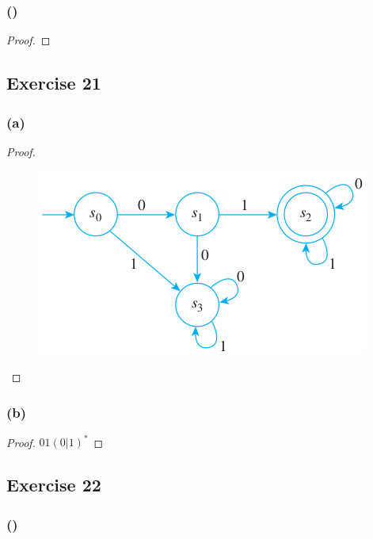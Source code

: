 \documentclass[14pt]{extarticle}
\begin{document}
\subsubsection{()}

\begin{proof}

\end{proof}

\subsection{Exercise 21}

\subsubsection{(a)}

\begin{proof}
\begin{figure}[ht!]
\centering
\includegraphics[scale=0.5]{../images/12.2.21.a.png}
\end{figure}
\end{proof}

\subsubsection{(b)}

\begin{proof}
\(01(0 | 1)^*\)
\end{proof}

\subsection{Exercise 22}

\subsubsection{()}
\end{document}
